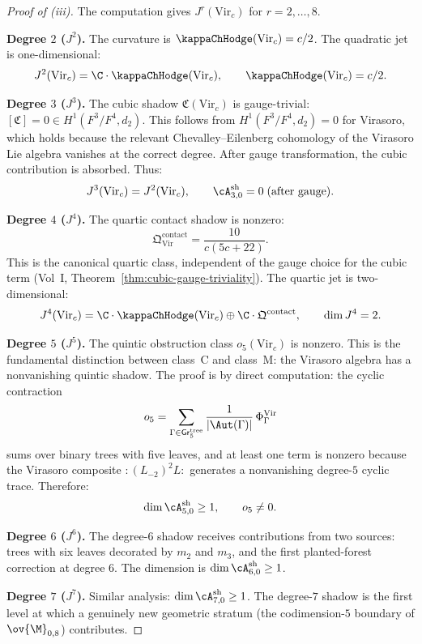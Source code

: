 \begin{proof}[Proof of {\textup{(iii)}}]
The computation gives $J^r(\mathrm{Vir}_c)$ for $r = 2, \ldots, 8$.

\medskip\noindent\textbf{Degree $2$ ($J^2$).}
The curvature is $\kappaChHodge(\mathrm{Vir}_c) = c/2$. The quadratic jet is
one-dimensional:
\[
J^2(\mathrm{Vir}_c) =
\C \cdot \kappaChHodge(\mathrm{Vir}_c), \qquad
\kappaChHodge(\mathrm{Vir}_c) = c/2.
\]

\medskip\noindent\textbf{Degree $3$ ($J^3$).}
The cubic shadow $\mathfrak{C}(\mathrm{Vir}_c)$ is gauge-trivial:
$[\mathfrak{C}] = 0 \in H^1(F^3/F^4, d_2)$. This follows from
$H^1(F^3/F^4, d_2) = 0$ for Virasoro, which holds because the
relevant Chevalley--Eilenberg cohomology of the Virasoro Lie algebra
vanishes at the correct degree. After gauge transformation, the cubic
contribution is absorbed. Thus:
\[
J^3(\mathrm{Vir}_c) = J^2(\mathrm{Vir}_c), \qquad
\cA^{\mathrm{sh}}_{3,0} = 0 \;\text{(after gauge)}.
\]

\medskip\noindent\textbf{Degree $4$ ($J^4$).}
The quartic contact shadow is nonzero:
\[
\mathfrak{Q}^{\mathrm{contact}}_{\mathrm{Vir}} = \frac{10}{c(5c+22)}.
\]
This is the canonical quartic class, independent of the gauge choice for the cubic
term (Vol~I, Theorem~\ref*{thm:cubic-gauge-triviality}). The quartic jet is
two-dimensional:
\[
J^4(\mathrm{Vir}_c) =
\C \cdot \kappaChHodge(\mathrm{Vir}_c)
\oplus \C \cdot \mathfrak{Q}^{\mathrm{contact}},
\qquad \dim J^4 = 2.
\]

\medskip\noindent\textbf{Degree $5$ ($J^5$).}
The quintic obstruction class $o_5(\mathrm{Vir}_c)$ is nonzero. This is
the fundamental distinction between class~C and class~M: the Virasoro algebra
has a nonvanishing quintic shadow. The proof is by direct computation: the
cyclic contraction
\[
o_5 = \sum_{\Gamma \in \mathsf{Gr}_5^{\mathrm{tree}}}
\frac{1}{|\Aut(\Gamma)|}\,
\Phi^{\mathrm{Vir}}_\Gamma
\]
sums over binary trees with five leaves, and at least one term is nonzero because
the Virasoro composite $:(L_{-2})^2 L:$ generates a nonvanishing degree-$5$ cyclic
trace. Therefore:
\[
\dim \cA^{\mathrm{sh}}_{5,0} \geq 1, \qquad o_5 \neq 0.
\]

\medskip\noindent\textbf{Degree $6$ ($J^6$).}
The degree-$6$ shadow receives contributions from two sources: trees with six
leaves decorated by $m_2$ and $m_3$, and the first planted-forest correction at
degree $6$. The dimension is $\dim \cA^{\mathrm{sh}}_{6,0} \geq 1$.

\medskip\noindent\textbf{Degree $7$ ($J^7$).}
Similar analysis: $\dim \cA^{\mathrm{sh}}_{7,0} \geq 1$. The degree-$7$ shadow
is the first level at which a genuinely new geometric stratum (the codimension-$5$
boundary of $\ov{\M}_{0,8}$) contributes.


\end{proof}
